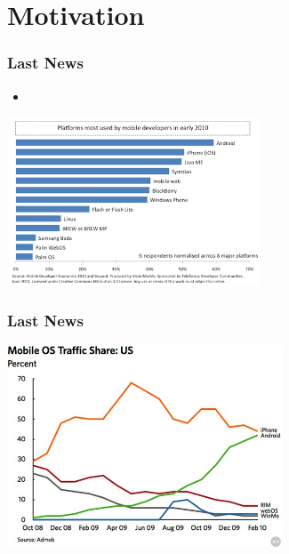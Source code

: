 \documentclass{beamer}
\begin{document}
\section{Motivation}
\begin{frame}
\frametitle{Last News}
\begin{itemize}

\item {}

\end{itemize}

\begin{center}
\includegraphics[height=5.0cm]{figs/DeveloperMindshare}
\end{center}
\end{frame}

\begin{frame}
\frametitle{Last News}
\begin{center}
\includegraphics[height=6.0cm]{figs/MovileOSTrafficShare}
\end{center}

\end{frame}
\end{document}
